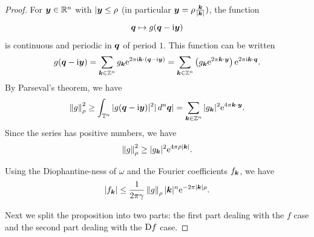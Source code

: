 \documentclass[twoside,letterpaper,10pt]{article}
\numberwithin{equation}{section}
\newcommand{\T}{\mathbb{T}}
\begin{document}
\begin{proof}
  For $\bm{y} \in \mathbb{R}^n$ with $|\bm{y} \leq \rho$ (in particular $\bm{y} = \rho
  \frac{\bm{k}}{|\bm{k}|})$, the function
  \begin{equation*}
    \bm{q} \mapsto g(\bm{q} - \mathrm{i} \bm{y})
  \end{equation*}
  is continuous and periodic in $\bm{q}$ of period $1$.
  This function can be written
  \begin{equation*}
    g(\bm{q} - \mathrm{i} \bm{y}) = \sum_{\bm{k} \in \mathbb{Z}^n} g_{\bm{k}} \mathrm{e}^{2 \pi \mathrm{i}
      \bm{k} \cdot (\bm{q} - \mathrm{i} \bm{y})} = \sum_{\bm{k} \in \mathbb{Z}^n}
    \left(g_{\bm{k}} \mathrm{e}^{2 \pi \bm{k} \cdot \bm{y}} \right) \mathrm{e}^{2 \pi \mathrm{i} \bm{k}
      \cdot \bm{q}}.
  \end{equation*}
  By Parseval's theorem, we have
  \begin{equation*}
    \norm{g}_{\rho}^2 \geq \int_{\T^n} |g(\bp{q} - \i \bp{y})|^2 |\dif ^n
    \bp{q}| = \sum_{\bp{k} \in \Z^n} |g_{\bp{k}}|^2 \e^{4 \pi \bp{k} \cdot \bp{y}}.
  \end{equation*}
  Since the series has positive numbers, we have
  \begin{equation*}
    \norm{g}_{\rho}^2 \geq |g_{\bp{k}}|^2 \e^{4 \pi \rho|\bp{k}|}.
  \end{equation*}

  Using the Diophantine-ness of $\omega$ and the Fourier coefficients
  $f_{\bm{k}}$, we have
  \begin{equation*}
    |f_{\bp{k}}| \leq \frac{1}{2 \pi \gamma} \norm{g}_{\rho} |\bp{k}|^n \e^{-2
      \pi |\bp{k}| \rho}.
  \end{equation*}

  Next we split the proposition into two parts: the first part dealing with the
  $f$ case and the second part dealing with the $\mathop{}\!\mathrm{D} f$ case.


\end{proof}
\end{document}

